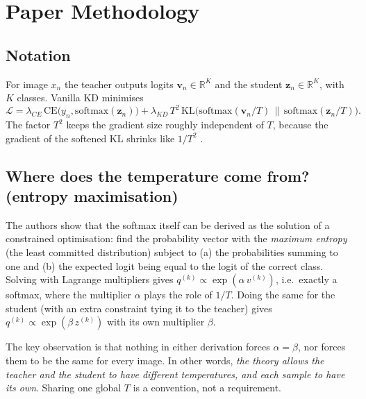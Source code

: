 \documentclass[12pt,a4paper]{article}
\begin{document}
\section{Paper Methodology}
\label{sec:method}

\subsection{Notation}
For image $x_n$ the teacher outputs logits $\mathbf{v}_n\in\mathbb{R}^K$ and the student $\mathbf{z}_n\in\mathbb{R}^K$, with $K$ classes. Vanilla KD minimises
\begin{equation}
\mathcal{L} = \lambda_{CE}\,\mathrm{CE}\big(y_n,\mathrm{softmax}(\mathbf{z}_n)\big) + \lambda_{KD}\,T^2\,\mathrm{KL}\big(\mathrm{softmax}(\mathbf{v}_n/T)\,\|\,\mathrm{softmax}(\mathbf{z}_n/T)\big).
\label{eq:kd}
\end{equation}
The factor $T^2$ keeps the gradient size roughly independent of $T$, because the gradient of the softened KL shrinks like $1/T^2$ \cite{hinton2015}.

\subsection{Where does the temperature come from? (entropy maximisation)}
The authors show that the softmax itself can be derived as the solution of a constrained optimisation: find the probability vector with the \emph{maximum entropy} (the least committed distribution) subject to (a) the probabilities summing to one and (b) the expected logit being equal to the logit of the correct class. Solving with Lagrange multipliers gives $q^{(k)}\propto\exp(\alpha\,v^{(k)})$, i.e.\ exactly a softmax, where the multiplier $\alpha$ plays the role of $1/T$. Doing the same for the student (with an extra constraint tying it to the teacher) gives $q^{(k)}\propto\exp(\beta\,z^{(k)})$ with its own multiplier $\beta$.

The key observation is that nothing in either derivation forces $\alpha=\beta$, nor forces them to be the same for every image. In other words, \emph{the theory allows the teacher and the student to have different temperatures, and each sample to have its own}. Sharing one global $T$ is a convention, not a requirement.
\end{document}
